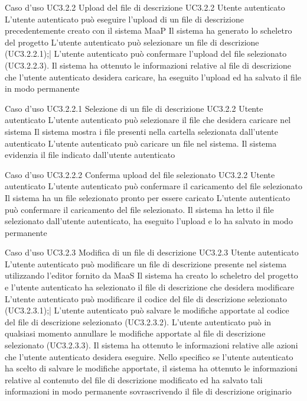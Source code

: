 \UCtitle
{Caso d'uso UC3.2.2}
{Upload del file di descrizione}
\UC
{UC3.2.2}
{Utente autenticato}
{L'utente autenticato può eseguire l'upload di un file di descrizione precedentemente creato con il sistema MaaP}
{Il sistema ha generato lo scheletro del progetto}
\scenario
{
L'utente autenticato può selezionare un file di descrizione (UC3.2.2.1);|
L'utente autenticato può confermare l'upload del file selezionato (UC3.2.2.3).
}
\post
{Il sistema ha ottenuto le informazioni relative al file di descrizione che l'utente autenticato desidera caricare, ha eseguito l'upload ed ha salvato il file in modo permanente}

\UCtitle
{Caso d'uso UC3.2.2.1}
{Selezione di un file di descrizione}
\UC
{UC3.2.2}
{Utente autenticato}
{L'utente autenticato può selezionare il file che desidera caricare nel sistema}
{Il sistema mostra i file presenti nella cartella selezionata dall'utente autenticato}
\scenario
{L'utente autenticato può caricare un file nel sistema.}
\post
{Il sistema evidenzia il file indicato dall'utente autenticato}

\UCtitle
{Caso d'uso UC3.2.2.2}
{Conferma upload del file selezionato}
\UC
{UC3.2.2}
{Utente autenticato}
{L'utente autenticato può confermare il caricamento del file selezionato}
{Il sistema ha un file selezionato pronto per essere caricato}
\scenario
{L'utente autenticato può confermare il caricamento del file selezionato.}
\post
{Il sistema ha letto il file selezionato dall'utente autenticato, ha eseguito l'upload e lo ha salvato in modo permanente}

\UCtitle
{Caso d'uso UC3.2.3}
{Modifica di un file di descrizione}
\UC
{UC3.2.3}
{Utente autenticato}
{L'utente autenticato può modificare un file di descrizione presente nel sistema utilizzando l'editor fornito da MaaS}
{Il sistema ha creato lo scheletro del progetto e l'utente autenticato ha selezionato il file di descrizione che desidera modificare}
\scenario
{L'utente autenticato può modificare il codice del file di descrizione selezionato (UC3.2.3.1);|
L'utente autenticato può salvare le modifiche apportate al codice del file di descrizione selezionato (UC3.2.3.2).
}
\estensioni
{L'utente autenticato può in qualsiasi momento annullare le modifiche apportate al file di descrizione selezionato (UC3.2.3.3).}
\post
{Il sistema ha ottenuto le informazioni relative alle azioni che l'utente autenticato desidera eseguire. Nello specifico se l'utente autenticato ha scelto di salvare le modifiche apportate, il sistema ha ottenuto le informazioni relative al contenuto del file di descrizione modificato ed ha salvato tali informazioni in modo permanente sovrascrivendo il file di descrizione originario}

